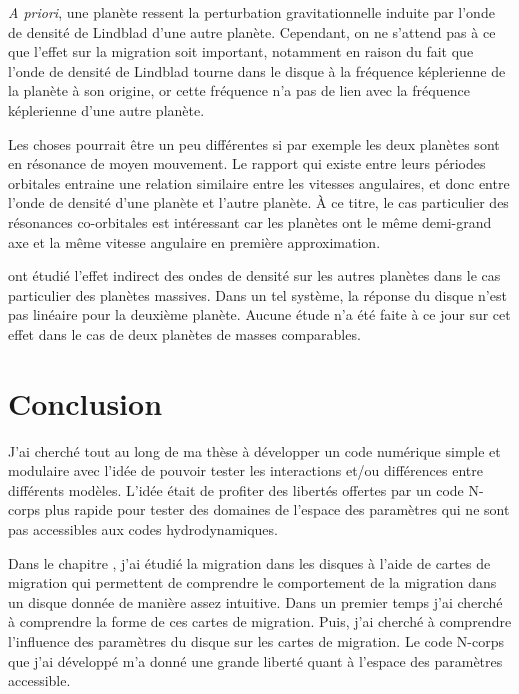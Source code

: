 \emph{A priori}, une planète ressent la perturbation gravitationnelle induite par l'onde de densité de Lindblad d'une autre planète. Cependant, on ne s'attend pas à ce que l'effet sur la migration soit important, notamment en raison du fait que l'onde de densité de Lindblad tourne dans le disque à la fréquence képlerienne de la planète à son origine, or cette fréquence n'a pas de lien avec la fréquence képlerienne d'une autre planète. 

Les choses pourrait être un peu différentes si par exemple les deux planètes sont en résonance de moyen mouvement. Le rapport qui existe entre leurs périodes orbitales entraine une relation similaire entre les vitesses angulaires, et donc entre l'onde de densité d'une planète et l'autre planète. À ce titre, le cas particulier des résonances co-orbitales est intéressant car les planètes ont le même demi-grand axe et la même vitesse angulaire en première approximation.

\cite{podlewska2012outward, baruteau2013disk} ont étudié l'effet indirect des ondes de densité sur les autres planètes dans le cas particulier des planètes massives. Dans un tel système, la réponse du disque n'est pas linéaire pour la deuxième planète. Aucune étude n'a été faite à ce jour sur cet effet dans le cas de deux planètes de masses comparables. 

\section{Conclusion}
J'ai cherché tout au long de ma thèse à développer un code numérique simple et modulaire avec l'idée de pouvoir tester les interactions et/ou différences entre différents modèles. L'idée était de profiter des libertés offertes par un code N-corps plus rapide pour tester des domaines de l'espace des paramètres qui ne sont pas accessibles aux codes hydrodynamiques. 

\bigskip

Dans le chapitre , j'ai étudié la migration dans les disques à l'aide de cartes de migration qui permettent de comprendre le comportement de la migration dans un disque donnée de manière assez intuitive. Dans un premier temps j'ai cherché à comprendre la forme de ces cartes de migration. Puis, j'ai cherché à comprendre l'influence des paramètres du disque sur les cartes de migration. Le code N-corps que j'ai développé m'a donné une grande liberté quant à l'espace des paramètres accessible. 

